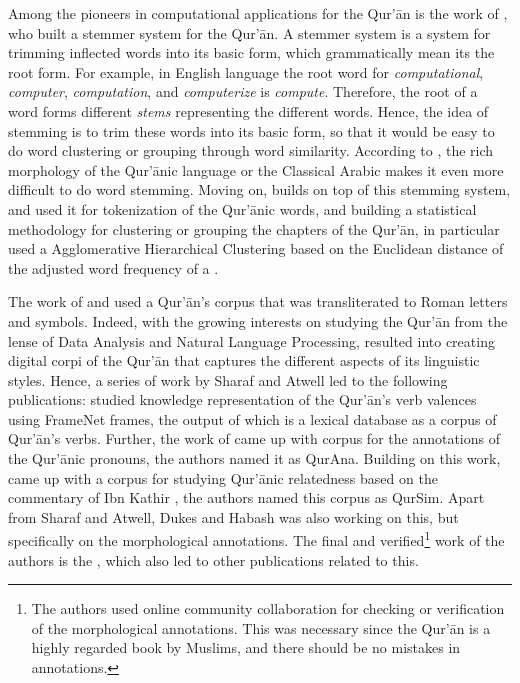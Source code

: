 Among the pioneers in computational applications for the Qur'\=an is the work of , who built a stemmer system for the Qur'\=an. A stemmer system is a system for trimming inflected words into its basic form, which grammatically mean its the root form. For example, in English language the root word for \textit{computational}, \textit{computer}, \textit{computation}, and \textit{computerize} is \textit{compute}. Therefore, the root of a word forms different \textit{stems} representing the different words. Hence, the idea of stemming is to trim these words into its basic form, so that it would be easy to do word clustering or grouping through word similarity. According to , the rich morphology of the Qur'\=anic language or the Classical Arabic makes it even more difficult to do word stemming. Moving on,  builds on top of this stemming system, and used it for tokenization of the Qur'\=anic words, and building a statistical methodology for clustering or grouping the chapters of the Qur'\=an, in particular  used a Agglomerative Hierarchical Clustering based on the Euclidean distance of the adjusted word frequency of a  .

The work of  and  used a Qur'\=an's corpus that was transliterated to Roman letters and symbols. Indeed, with the growing interests on studying the Qur'\=an from the lense of Data Analysis and Natural Language Processing, resulted into creating digital corpi of the Qur'\=an that captures the different aspects of its linguistic styles. Hence, a series of work by Sharaf and Atwell led to the following publications:  studied knowledge representation of the Qur'\=an's verb valences using FrameNet frames, the output of which is a lexical database as a corpus of Qur'\=an's verbs. Further, the work of  came up with corpus for the annotations of the Qur'\=anic pronouns, the authors named it as QurAna. Building on this work,  came up with a corpus for studying Qur'\=anic relatedness based on the commentary of Ibn Kathir , the authors named this corpus as QurSim. Apart from Sharaf and Atwell, Dukes and Habash was also working on this, but specifically on the morphological annotations. The final and verified\footnote{The authors used online community collaboration for checking or verification of the morphological annotations. This was necessary since the Qur'\=an is a highly regarded book by Muslims, and there should be no mistakes in annotations.} work of the authors is the , which also led to other publications  related to this.

